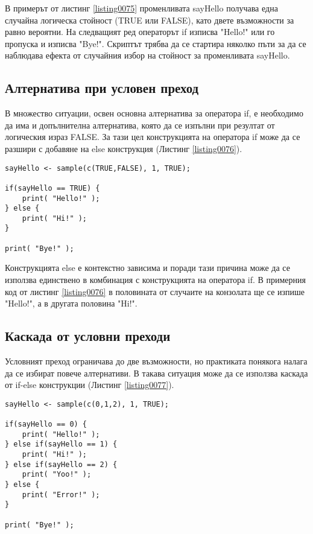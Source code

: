 В примерът от листинг \ref{listing0075} променливата sayHello получава една случайна логическа стойност (TRUE или FALSE), като двете възможности за равно вероятни. На следващият ред операторът if изписва "Hello!" или го пропуска и изписва "Bye!". Скриптът трябва да се стартира няколко пъти за да се наблюдава ефекта от случайния избор на стойност за променливата sayHello.

\subsection{Алтернатива при условен преход}

В множество ситуации, освен основна алтернатива за оператора if, е необходимо да има и допълнителна алтернатива, която да се изпълни при резултат от логическия израз FALSE. За тази цел конструкцията на оператора if може да се разшири с добавяне на else конструкция (Листинг \ref{listing0076}).

\begin{lstlisting}[caption=Оператор за условен преход if-else, label=listing0076]
sayHello <- sample(c(TRUE,FALSE), 1, TRUE);

if(sayHello == TRUE) {
	print( "Hello!" );
} else {
	print( "Hi!" );
}

print( "Bye!" );
\end{lstlisting}
Конструкцията else е контекстно зависима и поради тази причина може да се използва единствено в комбинация с конструкцията на оператора if. В примерния код от листинг \ref{listing0076} в половината от случаите на конзолата ще се изпише "Hello!", а в другата половина "Hi!".

\subsection{Каскада от условни преходи}

Условният преход ограничава до две възможности, но практиката понякога налага да се избират повече алтернативи. В такава ситуация може да се използва каскада от if-else конструкции (Листинг \ref{listing0077}).

\begin{lstlisting}[caption=Каскада от if-else, label=listing0077]
sayHello <- sample(c(0,1,2), 1, TRUE);

if(sayHello == 0) {
	print( "Hello!" );
} else if(sayHello == 1) {
	print( "Hi!" );
} else if(sayHello == 2) {
	print( "Yoo!" );
} else {
	print( "Error!" );
}

print( "Bye!" );
\end{lstlisting}


